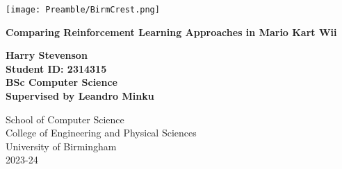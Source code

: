 
\thispagestyle{empty}

\begin{spacing}{2}
	\begin{center}
		\texttt{[image: Preamble/BirmCrest.png]}
	\end{center}
	\vspace{10mm}
	\begin{center}
		\textbf{\Large Comparing Reinforcement Learning Approaches in Mario Kart Wii}
		\vspace{10mm}
	\end{center}
	\begin{center}
		\vspace{20mm}
		\textbf{\Large Harry Stevenson}
            \\\textbf{\large Student ID: 2314315}
            \\\textbf{\large BSc Computer Science}
            \\\textbf{\large Supervised by Leandro Minku}
		\vspace{30mm}
	\end{center}
	\begin{center}
		{\large School of Computer Science}
		\\ {\large College of Engineering and Physical Sciences}
		\\ {\large University of Birmingham}
		\\ {\large 2023-24}
	\end{center}
\end{spacing}


